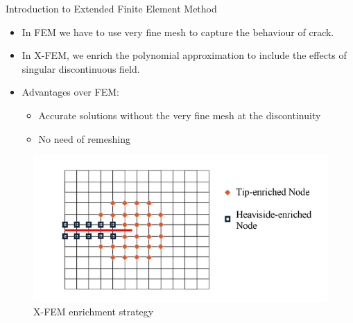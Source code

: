 \documentclass{beamer}
\begin{document}
\begin{frame}[t,fragile]{Introduction to Extended Finite Element Method }
    \vspace{-.3cm}
    \small
    \begin{itemize}
         \item In FEM we have to use very fine mesh to capture the behaviour of crack. 
\item In X-FEM, we enrich the polynomial approximation to include the effects of singular discontinuous field.
     \item Advantages over FEM:
    \begin{itemize}
         \item Accurate solutions without the very fine mesh at the discontinuity
         \item No need of remeshing 
    \end{itemize}
\end{itemize} 
\begin{figure}
     \centering
     \vspace{-10pt}
     \includegraphics[scale=.3]{enrich.png}
     \vspace{-.4cm}
     \caption{\hspace{-2cm}\footnotesize X-FEM enrichment strategy}
  \end{figure}
\end{frame}
\end{document}

